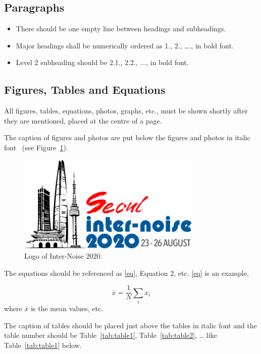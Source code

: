\subsection{Paragraphs}

\begin{itemize}
	\item There should be one empty line between headings and subheadings.
	\item Major headings shall be numerically ordered as 1., 2., …., in bold font.
	\item Level 2 subheading should be 2.1., 2.2., ..., in bold font.
\end{itemize}


\subsection{Figures, Tables and Equations}
All figures, tables, equations, photos, graphs, etc., must be shown shortly after they are mentioned, placed at the centre of a page. \par 
The caption of figures and photos are put below the figures and photos in italic font~\cite{andre18} (see Figure~\ref{fig:logo}).

\begin{figure}[H]
	\centering
	\includegraphics[width=88mm]{logo.pdf}
	\caption{Logo of Inter-Noise 2020.}
	\label{fig:logo}
\end{figure}

The equations should be referenced as \eqref{eq}, Equation 2, etc.
\eqref{eq} is an example,

\begin{equation}
	\bar x= \frac{1}{N}\sum_ix_i
	\label{eq}
\end{equation}
%
where $\bar{x}$ is the mean values, etc.

The caption of tables should be placed just above the tables in italic font and the table number should be  Table~\ref{tab:table1}, Table~\ref{tab:table2}, … like Table~\ref{tab:table1} below.

